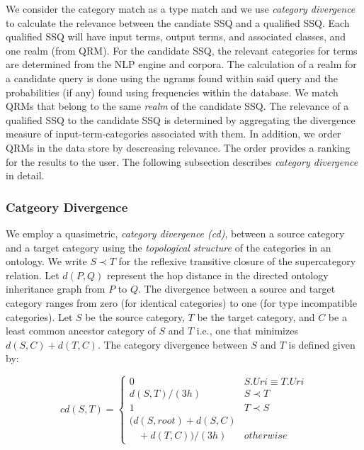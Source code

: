 We consider the category match as a type match and we use 
\emph{category divergence} to calculate the relevance between 
the candiate SSQ and a qualified SSQ. Each qualified SSQ will 
have input terms, output terms, and associated classes, and one realm (from QRM). 
For the candidate SSQ, the relevant categories for terms 
are determined from the NLP engine and corpora. The calculation of a realm 
for a candidate query is done using the ngrams found within said query 
and the probabilities (if any) found using frequencies within the database.
We match QRMs that belong to the same \emph{realm} of the candidate SSQ. 
The relevance of a qualified SSQ to the candidate SSQ is 
determined by aggregating the divergence measure of input-term-categories 
associated with them. In addition, we order QRMs in the data store 
by descreasing relevance. The order provides a ranking for the results 
to the user. The following subsection describes \emph{category divergence} 
in detail.

\subsubsection{Catgeory Divergence}
\label{sec:ctd}

We employ a quasimetric, \textit{category
divergence (cd)},
between a source category and a target category using the \textit{topological
structure} of the categories in an ontology. We write $S \prec T$ for the
reflexive
transitive closure of the supercategory relation. Let $d(P,Q)$ represent the hop
distance in the directed ontology inheritance graph from $P$ to $Q$. The
divergence between a source and target category ranges from zero (for identical
categories) to one (for type incompatible categories). Let $S$ be the source
category, $T$ be
the target category, and $C$ be a least common ancestor category of $S$ and
$T$ i.e., one that minimizes $d(S,C) + d(T,C)$. The category divergence between $S$ and $T$ is defined given by:

\begin{equation}
cd(S, T) = \begin{cases}
0 & S.{Uri} \equiv T.{Uri}\\
d(S, T)/(3h) & S \prec T\\
1 & T \prec S\\
(d(S,root) + d(S,C) \\ \ \ \ \ + d(T,C))/(3h) & otherwise
\end{cases}
\end{equation}


